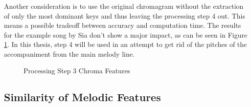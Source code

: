 \noindent Another consideration is to use the original chromagram without the extraction of only the most dominant keys and thus leaving the processing step 4 out. This means a possible tradeoff between accuracy and computation time. The results for the example song by Sia don't show a major impact, as can be seen in Figure \ref{fig:nomax}. In this thesis, step 4 will be used in an attempt to get rid of the pitches of the accompaniment from the main melody line.
\begin{figure}[htbp]
	\centering
	\caption{Processing Step 3 Chroma Features}
	\label{fig:nomax}
\end{figure}

\subsection{Similarity of Melodic Features}


